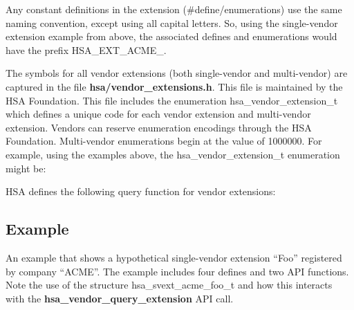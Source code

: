 \documentclass[draft]{book}
\newcommand{\reffun}[1]{\textbf{#1}}
\newcommand{\reftyp}[1]{#1}
\newcommand{\refenu}[1]{\reftyp{#1}}
\begin{document}
Any constant definitions in the extension (\#define/enumerations) use the same
naming convention, except using all capital letters. So, using the single-vendor
extension example from above, the associated defines and enumerations would have
the prefix \refenu{HSA_EXT_ACME_}.

The symbols for all vendor extensions (both single-vendor and multi-vendor) are
captured in the file {\bf hsa/vendor_extensions.h}. This file is maintained by
the HSA Foundation. This file includes the enumeration
\reftyp{hsa_vendor_extension_t} which defines a unique code for each vendor
extension and multi-vendor extension. Vendors can reserve enumeration encodings
through the HSA Foundation. Multi-vendor enumerations begin at the value of
1000000. For example, using the examples above, the
\reftyp{hsa_vendor_extension_t} enumeration might be:



HSA defines the following query function for vendor extensions:



\subsection{Example}
An example that shows a hypothetical single-vendor extension ``Foo'' registered
by company ``ACME''. The example includes four defines and two API functions.
Note the use of the structure \reftyp{hsa_svext_acme_foo_t} and how this
interacts with the \reffun{hsa_vendor_query_extension} API call.


\end{document}
